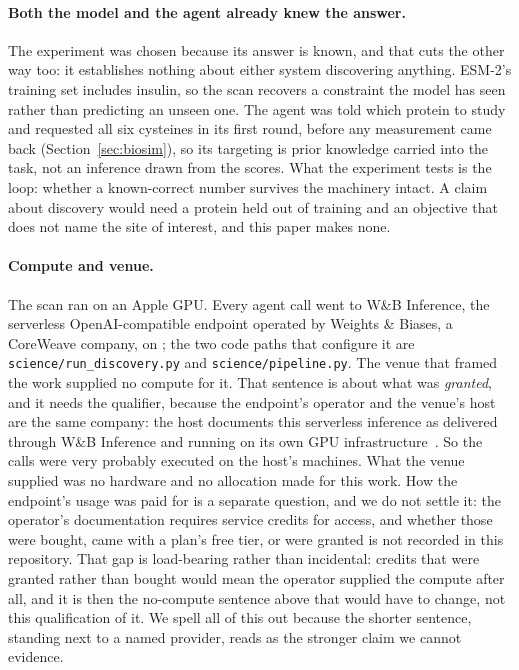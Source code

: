 \documentclass[10pt]{article}
\begin{document}
\paragraph{Both the model and the agent already knew the answer.} The experiment was chosen because its answer is known, and that cuts the other way too: it establishes nothing about either system discovering anything. ESM-2's training set includes insulin, so the scan recovers a constraint the model has seen rather than predicting an unseen one. The agent was told which protein to study and requested all six cysteines in its first round, before any measurement came back (Section~\ref{sec:biosim}), so its targeting is prior knowledge carried into the task, not an inference drawn from the scores. What the experiment tests is the loop: whether a known-correct number survives the machinery intact. A claim about discovery would need a protein held out of training and an objective that does not name the site of interest, and this paper makes none.

\paragraph{Compute and venue.} The scan ran on an Apple GPU. Every agent call went to W\&B Inference, the serverless OpenAI-compatible endpoint operated by Weights \& Biases, a CoreWeave company, on \texttt{\claimmodel{}}; the two code paths that configure it are \texttt{science/run\_discovery.py} and \texttt{science/pipeline.py}. The venue that framed the work supplied no compute for it. That sentence is about what was \emph{granted}, and it needs the qualifier, because the endpoint's operator and the venue's host are the same company: the host documents this serverless inference as delivered through W\&B Inference and running on its own GPU infrastructure~\cite{coreweave2026serverless}. So the calls were very probably executed on the host's machines. What the venue supplied was no hardware and no allocation made for this work. How the endpoint's usage was paid for is a separate question, and we do not settle it: the operator's documentation requires service credits for access, and whether those were bought, came with a plan's free tier, or were granted is not recorded in this repository. That gap is load-bearing rather than incidental: credits that were granted rather than bought would mean the operator supplied the compute after all, and it is then the no-compute sentence above that would have to change, not this qualification of it. We spell all of this out because the shorter sentence, standing next to a named provider, reads as the stronger claim we cannot evidence.
\end{document}
